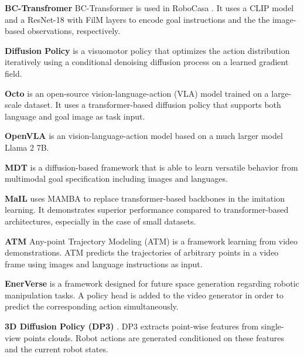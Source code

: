 \textbf{BC-Transfromer} BC-Transformer is used in RoboCasa \cite{nasiriany2024robocasalargescalesimulationeveryday}. It uses a CLIP model and a ResNet-18 with FilM layers to encode goal instructions and the the image-based observations, respectively.

\textbf{Diffusion Policy} \cite{chi2023diffusion} is a visuomotor policy that optimizes the action distribution iteratively using a conditional denoising diffusion process on a learned gradient field. 


\textbf{Octo} \cite{octo_2023} is an open-source vision-language-action (VLA) model trained on a large-scale dataset. It uses a transformer-based diffusion policy that supports both language and goal image as task input. 

\textbf{OpenVLA} \cite{kim2024openvlaopensourcevisionlanguageactionmodel} is an vision-language-action model based on a much larger model Llama 2 7B. 

\textbf{MDT} \cite{reuss2024multimodaldiffusiontransformerlearning} is a diffusion-based framework that is able to learn versatile behavior from multimodal goal specification including images and languages. 

\textbf{MaIL} \cite{jia2024mailimprovingimitationlearning} uses MAMBA to replace transformer-based backbones in the imitation learning. It demonstrates superior performance compared to transformer-based architectures, especially in the case of small datasets. 

\textbf{ATM} \cite{wen2024anypointtrajectorymodelingpolicy} Any-point Trajectory Modeling (ATM) is a framework learning from video demonstrations. ATM predicts the trajectories of arbitrary points in a video frame using images and language instructions as input. 

\textbf{EnerVerse} \cite{huang2025enerverseenvisioningembodiedfuture} is a framework designed for future space generation regarding robotic manipulation tasks. A policy head is added to the video generator in order to predict the corresponding action simultaneously.

\textbf{3D Diffusion Policy (DP3)} \cite{ze20243d}. DP3
extracts point-wise features from single-view points clouds. Robot actions are generated conditioned on these features and the current robot states.

